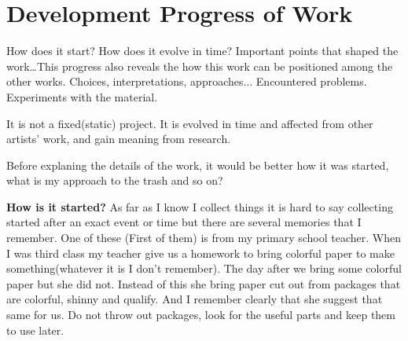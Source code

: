 %
%
\section{Development Progress of Work}
How does it start? How does it evolve in time? Important points that shaped the work\ldots This progress also reveals the how this work can be positioned among the other works. Choices, interpretations, approaches... Encountered problems. Experiments with the material.

It is not a fixed(static) project. It is evolved in time and affected from other artists' work, and gain meaning from research.

Before explaning the details of the work, it would be better how it was started, what is my approach to the trash and so on?





%
%
\textbf{How is it started?} As far as I know I collect things it is hard to say collecting started after an exact event or time but there are several memories that I remember. One of these (First of them) is from my primary school teacher. When I was third class my teacher give us a homework to bring colorful paper to make something(whatever it is I don't remember). The day after we bring some colorful paper but she did not. Instead of this she bring paper cut out from packages that are colorful, shinny and qualify. And I remember clearly that she suggest that same for us. Do not throw out packages, look for the useful parts and keep them to use later.  








